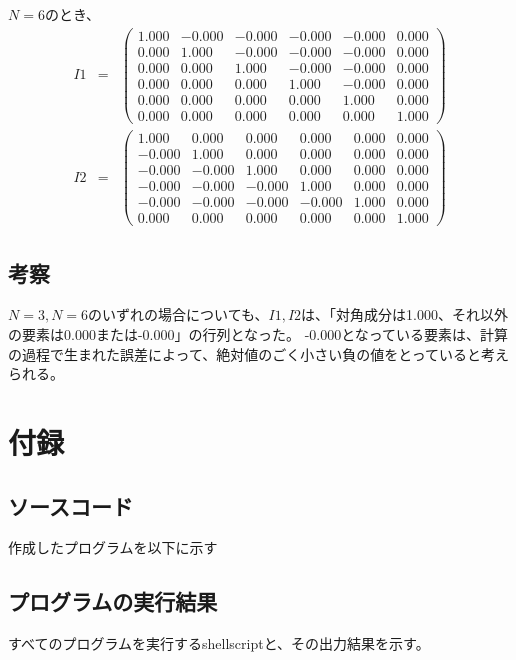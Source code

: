 \documentclass[11pt]{ujarticle}
\newcommand{\code}[2]{
	
}
\begin{document}
			$N=6$のとき、
			\begin{eqnarray*}
				I1 & = & \left( \begin{array}{cccccc}
					1.000 & -0.000 & -0.000 & -0.000 & -0.000 & 0.000\\
					0.000 & 1.000 & -0.000 & -0.000 & -0.000 & 0.000\\
					0.000 & 0.000 & 1.000 & -0.000 & -0.000 & 0.000\\
					0.000 & 0.000 & 0.000 & 1.000 & -0.000 & 0.000\\
					0.000 & 0.000 & 0.000 & 0.000 & 1.000 & 0.000\\
					0.000 & 0.000 & 0.000 & 0.000 & 0.000 & 1.000
				\end{array} \right)\\
				I2 & = & \left( \begin{array}{cccccc}
					1.000 & 0.000 & 0.000 & 0.000 & 0.000 & 0.000\\
					-0.000 & 1.000 & 0.000 & 0.000 & 0.000 & 0.000\\
					-0.000 & -0.000 & 1.000 & 0.000 & 0.000 & 0.000\\
					-0.000 & -0.000 & -0.000 & 1.000 & 0.000 & 0.000\\
					-0.000 & -0.000 & -0.000 & -0.000 & 1.000 & 0.000\\
					0.000 & 0.000 & 0.000 & 0.000 & 0.000 & 1.000
				\end{array} \right)
			\end{eqnarray*}
			
		\subsection{考察}
			$N=3,N=6$のいずれの場合についても、$I1,I2$は、「対角成分は1.000、それ以外の要素は0.000または-0.000」の行列となった。
			-0.000となっている要素は、計算の過程で生まれた誤差によって、絶対値のごく小さい負の値をとっていると考えられる。

	\newpage
	\section*{付録}
		\subsection*{ソースコード}
			作成したプログラムを以下に示す
			\code{共通}{print.go}
			\code{問１}{1.go}
			\code{問１}{forward.go}
			\code{問２}{2.go}
			\code{問２}{backward.go}
			\code{問４}{lu.go}
			\code{問４}{solve.go}
			\code{問５}{5.go}
			\code{問６}{"6\string_1.go"}
			\code{問６}{"6\string_2.go"}
			\code{問６}{6.go}
			\code{問８}{"8\string_1.go"}
			\code{問８}{"8\string_2.go"}
			\code{問８}{8.go}
			\code{問８}{inverse.go}
		\newpage

		\subsection*{プログラムの実行結果}
			すべてのプログラムを実行するshellscriptと、その出力結果を示す。
			
			
\end{document}
